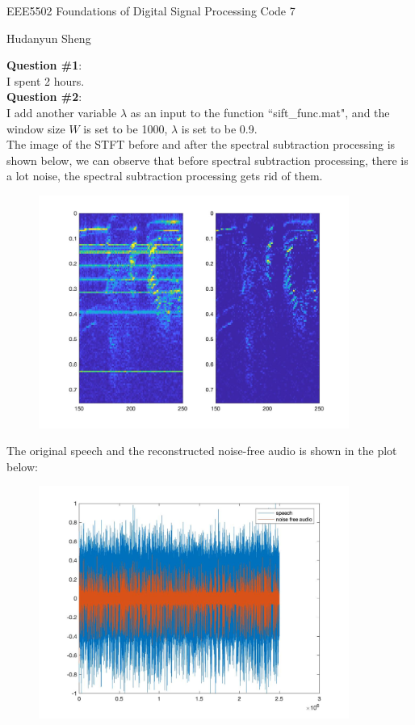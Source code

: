 \documentclass[a4paper]{article}
\begin{document}
\begin{spacing}{2.0}
\begin{flushleft}\begin{huge}EEE5502 Foundations of Digital Signal Processing   Code 7\end{huge}\end{flushleft}
\begin{flushright}\begin{Large} Hudanyun Sheng \end{Large}\end{flushright}

\Large\textbf{ Question \#1}:  \\
\normalsize
I spent 2 hours.\\

\Large\textbf{Question \#2}:  \\
\normalsize
I add another variable $\lambda$ as an input to the function ``sift\_func.mat", and the window size $W$ is set to be 1000, $\lambda$ is set to be 0.9.\\
The image of the STFT before and after the spectral subtraction processing is shown below, we can observe that before spectral subtraction processing, there is a lot noise, the spectral subtraction processing gets rid of them. 
\begin{figure} [H]
\centering
\includegraphics[width=4in]{1.jpg}
\label{fig:graph}
\end{figure}

The original speech and the reconstructed noise-free audio is shown in the plot below:
\begin{figure} [H]
\centering
\includegraphics[width=4in]{1_audio.jpg}
\label{fig:graph}
\end{figure}








\end{spacing}
\end{document}
